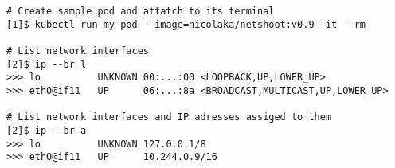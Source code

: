 \begin{lstfloat}
\begin{lstlisting}[style=mybashstyle,
caption={Nastavení síťových prostředků v podu},
label={cmd:podNet}
]
# Create sample pod and attatch to its terminal
[1]$ kubectl run my-pod --image=nicolaka/netshoot:v0.9 -it --rm

# List network interfaces
[2]$ ip --br l
>>> lo          UNKNOWN 00:...:00 <LOOPBACK,UP,LOWER_UP> 
>>> eth0@if11   UP      06:...:8a <BROADCAST,MULTICAST,UP,LOWER_UP>

# List network interfaces and IP adresses assiged to them
[2]$ ip --br a
>>> lo          UNKNOWN 127.0.0.1/8 
>>> eth0@if11   UP      10.244.0.9/16  
\end{lstlisting}
\end{lstfloat}